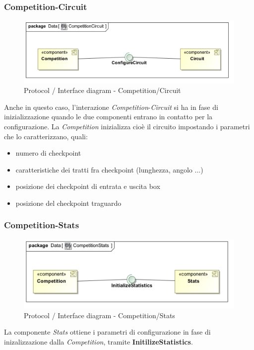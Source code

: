 \subsubsection{Competition-Circuit}
\begin{center}
\begin{figure}[h!]
	\includegraphics[scale=0.55]{img/InteractionDiagram/Implementation_Diagram__CompetitionCircuit.jpg}
\caption{Protocol / Interface diagram - Competition/Circuit}
\end{figure}
\end{center}
Anche in questo caso, l'interazione \emph{Competition}-\emph{Circuit} si ha in fase di inizializzazione quando le due componenti entrano in contatto
per la configurazione. La \emph{Competition} inizializza cio\`{e} il circuito impostando i parametri che lo caratterizzano, quali:
	\begin{itemize}
		\item numero di checkpoint
		\item caratteristiche dei tratti fra checkpoint (lunghezza, angolo ...)
		\item posizione dei checkpoint di entrata e uscita box
		\item posizione del checkpoint traguardo
	\end{itemize}
\subsubsection{Competition-Stats}
\begin{center}
\begin{figure}[h!]
	\includegraphics[scale=0.55]{img/InteractionDiagram/Implementation_Diagram__CompetitionStats.jpg}
\caption{Protocol / Interface diagram - Competition/Stats}
\end{figure}
\end{center}
La componente \emph{Stats} ottiene i parametri di configurazione in fase di inizalizzazione dalla \emph{Competition}, tramite
\textbf{InitilizeStatistics}.
\clearpage
